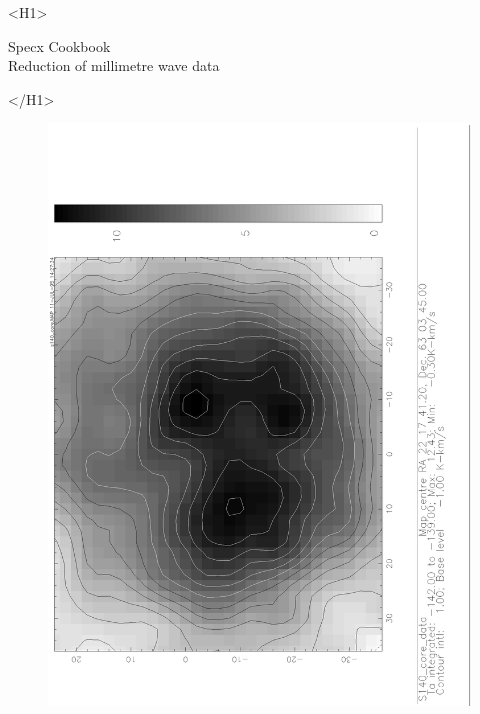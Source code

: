 \documentclass[11pt,twoside]{article}
\newcommand{\stardoctitle}     {Specx Cookbook \\[\latex{2ex}]
                                Reduction of millimetre wave data}
\newcommand{\stardocversion}   {[software-version]}
\newcommand{\stardocmanual}    {[manual-type]}
\newcommand{\xlabel}[1]{}
\newcommand{\latex}[1]{#1}
\begin{document}
\begin{htmlonly}
   \xlabel{}
   \begin{rawhtml} <H1> \end{rawhtml}
      \stardoctitle\\
   \begin{rawhtml} </H1> \end{rawhtml}

   \begin{figure}[h]
   \includegraphics[angle=-90,width=120mm]{sc8_gray.ps}
   \end{figure}


\end{htmlonly}
\end{document}
